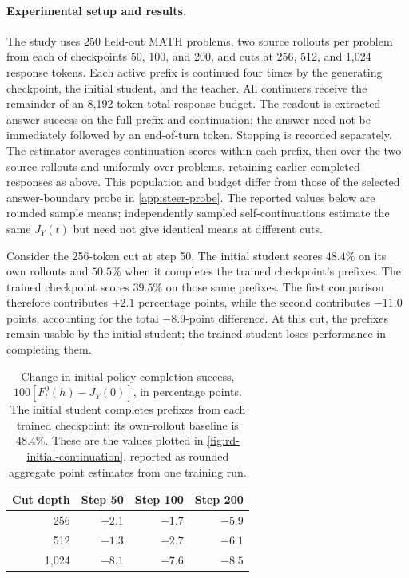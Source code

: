\paragraph{Experimental setup and results.}
The study uses 250 held-out MATH problems, two source rollouts per problem from each of checkpoints 50, 100, and 200, and cuts at 256, 512, and 1,024 response tokens. Each active prefix is continued four times by the generating checkpoint, the initial student, and the teacher. All continuers receive the remainder of an 8,192-token total response budget. The readout is extracted-answer success on the full prefix and continuation; the answer need not be immediately followed by an end-of-turn token. Stopping is recorded separately. The estimator averages continuation scores within each prefix, then over the two source rollouts and uniformly over problems, retaining earlier completed responses as above. This population and budget differ from those of the selected answer-boundary probe in \cref{app:steer-probe}. The reported values below are rounded sample means; independently sampled self-continuations estimate the same $J_Y(t)$ but need not give identical means at different cuts.

Consider the 256-token cut at step 50. The initial student scores $48.4\%$ on its own rollouts and $50.5\%$ when it completes the trained checkpoint's prefixes. The trained checkpoint scores $39.5\%$ on those same prefixes. The first comparison therefore contributes $+2.1$ percentage points, while the second contributes $-11.0$ points, accounting for the total $-8.9$-point difference. At this cut, the prefixes remain usable by the initial student; the trained student loses performance in completing them.

\begin{table}[ht]
\centering\small
\setlength{\tabcolsep}{8pt}
\begin{tabular}{r rrr}
\toprule
Cut depth & Step 50 & Step 100 & Step 200\\
\midrule
256   & $+2.1$ & $-1.7$ & $-5.9$\\
512   & $-1.3$ & $-2.7$ & $-6.1$\\
1,024 & $-8.1$ & $-7.6$ & $-8.5$\\
\bottomrule
\end{tabular}
\caption{Change in initial-policy completion success, $100[F_t^0(h)-J_Y(0)]$, in percentage points. The initial student completes prefixes from each trained checkpoint; its own-rollout baseline is $48.4\%$. These are the values plotted in \cref{fig:rd-initial-continuation}, reported as rounded aggregate point estimates from one training run.}
\label{tab:continuation-reference}
\end{table}


